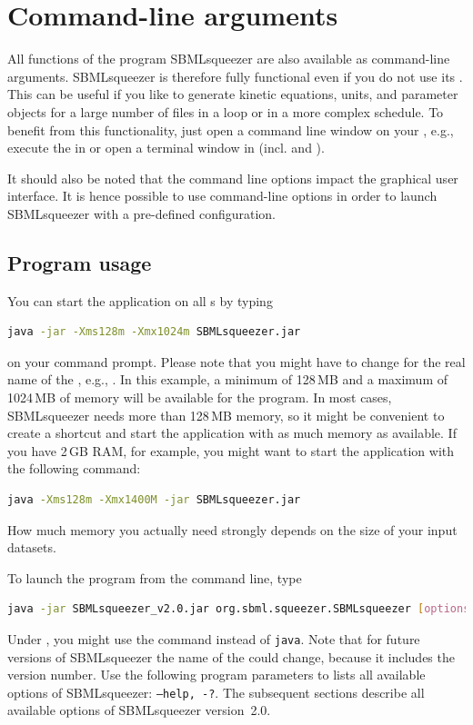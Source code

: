  

\chapter{Command-line arguments}
\label{chap:CMD}
\renewcommand{\descriptionlabel}[1]{\textcolor{blue}{\texttt{#1}}}

All functions of the program SBMLsqueezer are also available as command-line
arguments. SBMLsqueezer is therefore fully functional even if you do not use
its \GUI.
This can be useful if you like to generate kinetic equations, units, and
parameter objects for a large number of \SBML files in a loop or in a more
complex schedule.
To benefit from this functionality, just open a command line window on your
\OS, e.g., execute the  in \Windows or open a terminal window
in \Unix (incl. \Linux and \MacOSX).

It should also be noted that the command line options impact the graphical user
interface. It is hence possible to use command-line options in order to launch
SBMLsqueezer with a pre-defined configuration.

\section{Program usage}
\label{sec:Program_usage}

You can start the application on all {\OS}s by typing
\begin{lstlisting}[language=bash,numbers=none]
java -jar -Xms128m -Xmx1024m SBMLsqueezer.jar
\end{lstlisting}
on your command prompt. Please note that you might have to change
 for the real name of the \JAR, e.g.,
. In this example, a minimum of 128\,MB
and a maximum of 1024\,MB of memory will be available for the program. In most cases,
SBMLsqueezer needs more than 128\,MB memory, so it might be convenient to create a
shortcut and start the application with as much memory as available. If you
have 2\,GB RAM, for example, you might want to start the application with the
following command:
\begin{lstlisting}[language=bash,numbers=none]
java -Xms128m -Xmx1400M -jar SBMLsqueezer.jar
\end{lstlisting}
How much memory you actually need strongly depends on the size of your input datasets.

To launch the program from the command line, type
\begin{lstlisting}[language=bash,numbers=none]
java -jar SBMLsqueezer_v2.0.jar org.sbml.squeezer.SBMLsqueezer [options]
\end{lstlisting}
Under \Windows, you might use the command  instead of
\texttt{java}. Note that for future versions of SBMLsqueezer the name of the
\JAR could change, because it includes the version number.
Use the following program parameters to lists all available options of
SBMLsqueezer: \texttt{--help, -?}.
The subsequent sections describe all available options of SBMLsqueezer
version~2.0. 

